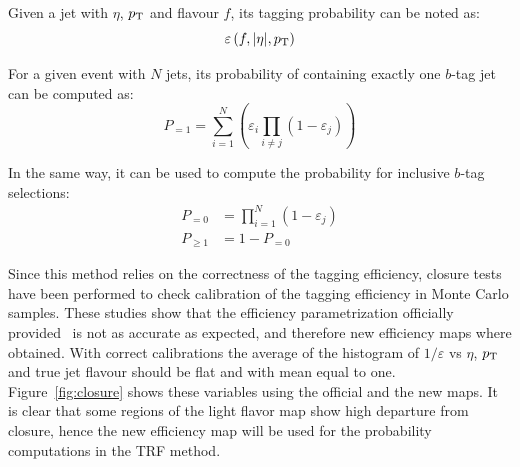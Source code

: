 Given a jet with $\eta$, $\pt$ and flavour $f$, its tagging probability can be noted as:
\begin{equation*}
        \varepsilon \left(f,|\eta|,\pt\right)
\end{equation*}

For a given event with $N$ jets, its probability of containing exactly one $b$-tag jet can be computed as:
\begin{equation*}
        P_{=1} = \sum\limits_{i=1}^N \left( \varepsilon_{i} \prod\limits_{i \neq j} \left( 1 - \varepsilon_{j} \right) \right)
\end{equation*}

In the same way, it can be used to compute the probability for inclusive $b$-tag selections:
\begin{align*}
        P_{=0} &= \prod\limits_{i=1}^N \left( 1 - \varepsilon_{j} \right) \\
        P_{\geq 1} &= 1 - P_{=0}
\end{align*}

Since this method relies on the correctness of the tagging efficiency,  closure tests have been performed to check
calibration of the tagging efficiency in Monte Carlo samples. These studies show that the efficiency parametrization
officially provided~\cite{topcommon2013}  is not as accurate as expected, and therefore new efficiency maps where
obtained. With correct calibrations the average of the histogram of $1/\varepsilon$ vs $\eta$, $\pt$ and true jet flavour 
should be flat and with mean equal to one. Figure~\ref{fig:closure} shows these variables using the official and the new maps.
It is clear that some regions of the light flavor map show high departure from closure, hence the
new efficiency map will be used for the probability computations in the TRF method.

